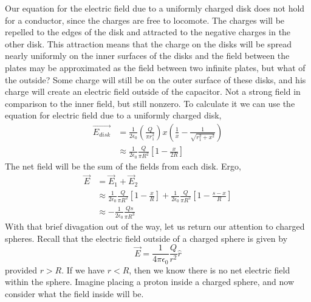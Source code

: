 \documentclass[nobib]{tufte-handout}
\begin{document}
Our equation for the electric field due to a uniformly charged disk does not hold 
for a conductor, since the charges are free to locomote. The charges will be repelled 
to the edges of the disk and attracted to the negative charges in the other disk. 
This attraction means that the charge on the disks will be spread nearly uniformly 
on the inner surfaces of the disks and the field between the plates may be 
approximated as the field between two infinite plates, but what of the outside? 
Some charge will still be on the outer surface of these disks, and his charge will 
create an electric field outside of the capacitor. Not a strong field
in comparison to the inner field, but still nonzero. To calculate it we can use the equation
for electric field due to a uniformly charged disk, 
\begin{align*}
    \vec{E_{disk}} &= \frac{1}{2 \epsilon_0}\left(\frac{Q}{\pi r_{1}^{2}}\right)x\left(\frac{1}{x}-\frac{1}{\sqrt{r_{1}^{2}+x^{2}}}\right) \\
    &\approx \frac{1}{2 \epsilon_0}\frac{Q}{\pi R^2}\left[1-\frac{x}{2R}\right]
\end{align*}
The net field will be the sum of the fields from each disk. Ergo, 
\begin{align*}
    \vec{E} &= \vec{E}_{1} + \vec{E}_{2} \\
    &\approx \frac{1}{2 \epsilon_0}\frac{Q}{\pi R^2}\left[1-\frac{x}{R}\right] + \frac{1}{2 \epsilon_0}\frac{Q}{\pi R^2}\left[1-\frac{s-x}{R}\right] \\
    &\approx -\frac{1}{2 \epsilon_0}\frac{Qs}{\pi R^3}
\end{align*}
With that brief divagation out of the way, let us return our attention to charged spheres. 
Recall that the electric field outside of a charged sphere is given by 
\[\vec{E} = \frac{1}{4 \pi \epsilon_0}\frac{Q}{r^2}\hat{r}\]
provided $r > R$. If we have $r < R$, then we know there is no net electric field within the 
sphere. 
Imagine placing a proton inside a charged sphere, and now consider what the field inside will be.
\end{document}
